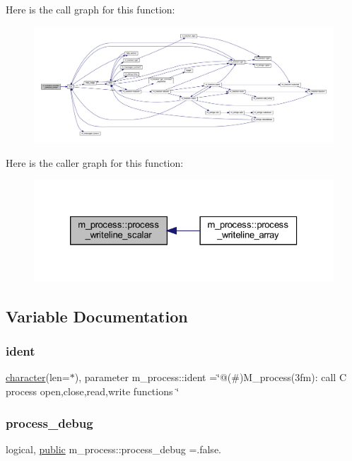 Here is the call graph for this function\+:
\nopagebreak
\begin{figure}[H]
\begin{center}
\leavevmode
\includegraphics[width=350pt]{namespacem__process_a72527c0ec0af26dcb14b8bfad6dcd482_cgraph}
\end{center}
\end{figure}
Here is the caller graph for this function\+:
\nopagebreak
\begin{figure}[H]
\begin{center}
\leavevmode
\includegraphics[width=326pt]{namespacem__process_a72527c0ec0af26dcb14b8bfad6dcd482_icgraph}
\end{center}
\end{figure}


\subsection{Variable Documentation}
\mbox{\label{namespacem__process_ac360b3ab77dd978287edf0a0773922de}} 
\subsubsection{\texorpdfstring{ident}{ident}}
{\footnotesize\ttfamily \hyperlink{option__stopwatch_83_8txt_abd4b21fbbd175834027b5224bfe97e66}{character}(len=$\ast$), parameter m\+\_\+process\+::ident =\char`\"{}@(\#)M\+\_\+process(3fm)\+: call C process open,close,read,write functions \char`\"{}}

\mbox{\label{namespacem__process_a0fabee8d01338d5523fbdea5c5f1e894}} 
\subsubsection{\texorpdfstring{process\+\_\+debug}{process\_debug}}
{\footnotesize\ttfamily logical, \hyperlink{M__stopwatch_83_8txt_a2f74811300c361e53b430611a7d1769f}{public} m\+\_\+process\+::process\+\_\+debug =.false.}

